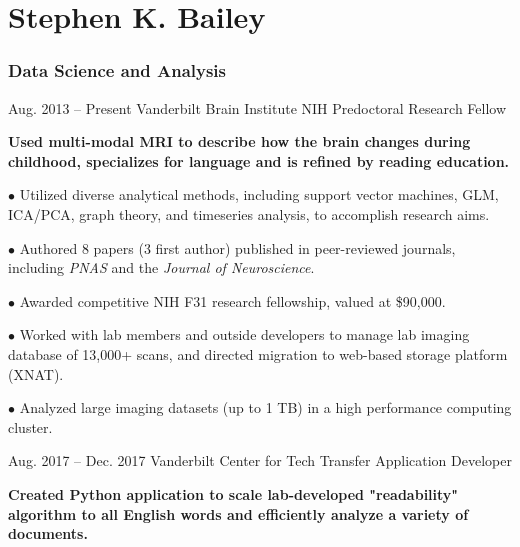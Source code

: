 \documentclass{tccv}
\begin{document}
\part{Stephen K. Bailey}

\section{Data Science and Analysis}

\begin{eventlist}

\item{Aug. 2013 -- Present}
     {Vanderbilt Brain Institute}
     {NIH Predoctoral Research Fellow}  
     
     \textbf{Used multi-modal MRI to describe how the brain changes during childhood, specializes for language and is refined by reading education.} 
     \newline

\begin{factlist}
    \item{$\bullet$}
         {Utilized diverse analytical methods, including support vector machines, GLM, ICA/PCA, graph theory, and timeseries analysis, to accomplish research aims. }
         
    \item{$\bullet$}
         {Authored 8 papers (3 first author) published in peer-reviewed journals,  including  \textit{PNAS} and the  \textit{Journal of Neuroscience}.}     
    
    \item{$\bullet$}
         {Awarded competitive NIH F31 research fellowship, valued at \$90,000.}

    \item{$\bullet$}
         {Worked with lab members and outside developers to manage lab imaging database of 13,000+ scans, and directed migration to web-based storage platform (XNAT).}
         
    \item{$\bullet$}
         {Analyzed large imaging datasets (up to 1 TB) in a high performance computing cluster.}
    
\end{factlist}


\item{Aug. 2017 -- Dec. 2017}
     {Vanderbilt Center for Tech Transfer}
     {Application Developer}  
     
    \textbf{Created Python application to scale lab-developed "readability" algorithm to all English words and efficiently analyze a variety of documents.} 
    \newline


\end{eventlist}
\end{document}
